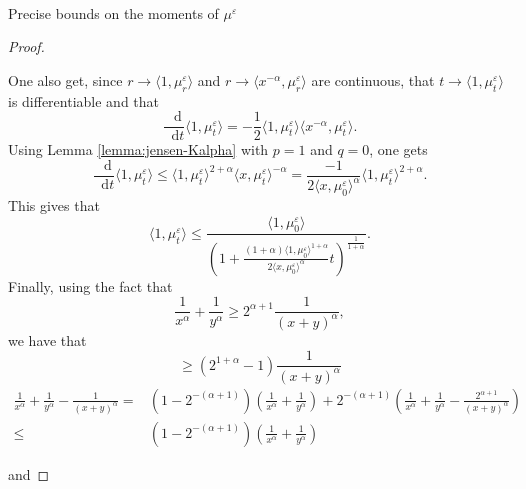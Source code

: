 \documentclass[a4paper,11pt, reqno]{amsart}
\newcommand{\eps}{\varepsilon}
\newcommand{\dd}{\mathop{}\!\mathrm{d}}
\newcommand{\red}[1]{{\color{red} #1}}
\newcommand{\1}{\mathbbm{1}}
\theoremstyle{plain}
\theoremstyle{definition}
\begin{document}
\

\red{Precise bounds on the moments of $\mu^{\eps}$

\begin{proof}
  \
  
  One also get, since $r \rightarrow \langle 1, \mu^{\eps}_r \rangle$
  and $r \rightarrow \langle x^{- \alpha}, \mu^{\eps}_r \rangle$ are
  continuous, that $t \rightarrow \langle 1, \mu^{\eps}_t \rangle$ is
  differentiable and that
  \[ \frac{\dd}{\dd t} \langle 1, \mu^{\eps}_t \rangle = -
     \frac{1}{2} \langle 1, \mu^{\eps}_t \rangle \langle x^{- \alpha},
     \mu^{\eps}_t \rangle . \]
  Using Lemma \ref{lemma:jensen-Kalpha} with $p = 1$ and $q = 0$, one gets
  \[ \frac{\dd}{\dd t} \langle 1, \mu^{\eps}_t \rangle \le
     \langle 1, \mu_t^{\eps} \rangle^{2 + \alpha} \langle x,
     \mu_t^{\eps} \rangle^{- \alpha} = \frac{- 1}{2 \langle x,
     \mu_0^{\eps} \rangle^{\alpha}} \langle 1, \mu_t^{\eps}
     \rangle^{2 + \alpha} . \]
  This gives that
  \[ \langle 1, \mu^{\eps}_t \rangle \le \frac{\langle 1,
     \mu^{\eps}_0 \rangle}{\left( 1 + \frac{(1 + \alpha) \langle 1,
     \mu^{\eps}_0 \rangle^{1 + \alpha}}{2 \langle x,
     \mu_0^{\eps} \rangle^{\alpha}} t \right)^{\frac{1}{1 + \alpha}}} .
  \]
  Finally, using the fact that
  \[ \frac{1}{x^{\alpha}} + \frac{1}{y^{\alpha}} \ge 2^{\alpha + 1}
     \frac{1}{(x + y)^{\alpha}}, \]
  we have that
  \[ \ge (2^{1 + \alpha} - 1) \frac{1}{(x + y)^{\alpha}} \]
  \begin{align*}
    \frac{1}{x^{\alpha}} + \frac{1}{y^{\alpha}} - \frac{1}{(x + y)^{\alpha}} =
    & (1 - 2^{- (\alpha + 1)}) \left( \frac{1}{x^{\alpha}} +
    \frac{1}{y^{\alpha}} \right) + 2^{- (\alpha + 1)} \left(
    \frac{1}{x^{\alpha}} + \frac{1}{y^{\alpha}} - \frac{2^{\alpha + 1}}{(x +
    y)^{\alpha}} \right)\\
    \le & (1 - 2^{- (\alpha + 1)}) \left( \frac{1}{x^{\alpha}} +
    \frac{1}{y^{\alpha}} \right)
  \end{align*}
  
  and
  

\end{proof}}
\end{document}
